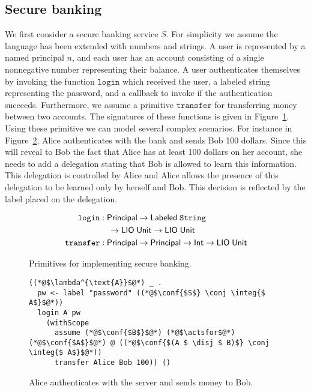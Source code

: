 \documentclass[conference]{IEEEtran}
\begin{document}
\subsection{Secure banking}
We first consider a secure banking service $S$. For simplicity we assume the language has been extended with numbers and strings. A user is represented by a named principal $n$, and each user has an account consisting of a single nonnegative number representing their balance. A user authenticates themselves by invoking the function $\mathtt{login}$ which received the user, a labeled string representing the password, and a callback to invoke if the authentication succeeds. Furthermore, we assume a primitive $\mathtt{transfer}$ for transferring money between two accounts. The signatures of these functions is given in Figure~\ref{fig:sec-banking-sigs}.
Using these primitive we can model several complex scenarios. For instance in Figure~\ref{fig:sec-bank-alice-send-to-bob}, Alice authenticates with the bank and sends Bob 100 dollars. Since this will reveal to Bob the fact that Alice has at least 100 dollars on her account, she needs to add a delegation stating that Bob is allowed to learn this information. This delegation is controlled by Alice and Alice allows the presence of this delegation to be learned only by herself and Bob. This decision is reflected by the label placed on the delegation.

\begin{figure}
    \centering
    \begin{align*}
\mathtt{login}&: \mathsf{Principal} \to \mathsf{Labeled}\;\mathtt{String} \\ &\quad \to \mathsf{LIO}\;\mathsf{Unit} \to \mathsf{LIO}\;\mathsf{Unit}\\
\mathtt{transfer}&: \mathsf{Principal} \to \mathsf{Principal} \to \mathsf{Int} \to \mathsf{LIO}\;\mathsf{Unit}
\end{align*}
    \caption{Primitives for implementing secure banking.}
    \label{fig:sec-banking-sigs}
\end{figure}


\begin{figure}
    \centering
\begin{lstlisting}
((*@$\lambda^{\text{A}}$@*) _ .
  pw <- label "password" ((*@$\conf{$S$} \conj \integ{$ A$}$@*))
  login A pw
    (withScope
      assume (*@$\conf{$B$}$@*) (*@$\actsfor$@*) (*@$\conf{$A$}$@*) @ ((*@$\conf{$(A $ \disj $ B)$} \conj \integ{$ A$}$@*))
      transfer Alice Bob 100)) ()
\end{lstlisting}
\caption{Alice authenticates with the server and sends money to Bob.}
\label{fig:sec-bank-alice-send-to-bob}
\end{figure}
\end{document}
